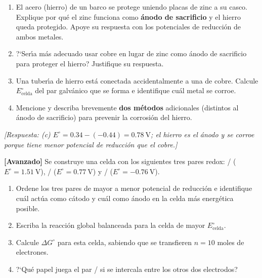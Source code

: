 \begin{bloque_ejercicios}
\begin{ejercicios}
\begin{enumerate}[label=\alph*)]
    \item El acero (hierro) de un barco se protege uniendo placas de zinc
          a su casco. Explique por qu\'e el zinc funciona como \textbf{\'anodo
          de sacrificio} y el hierro queda protegido.  Apoye su respuesta
          con los potenciales de reducci\'on de ambos metales.
    \item ?`Ser\'{\i}a m\'as adecuado usar cobre en lugar de zinc como \'anodo
          de sacrificio para proteger el hierro? Justifique su respuesta.
    \item Una tuber\'{\i}a de hierro est\'a conectada accidentalmente a una
          de cobre. Calcule $E^\circ_{\text{celda}}$ del par galv\'anico que
          se forma e identifique cu\'al metal se corroe.
    \item Mencione y describa brevemente \textbf{dos m\'etodos} adicionales
          (distintos al \'anodo de sacrificio) para prevenir la corrosi\'on
          del hierro.
\end{enumerate}

\textit{[Respuesta:
(c) $E^\circ = 0.34 - (-0.44) = \SI{0.78}{\volt}$; el hierro es el \'anodo
    y se corroe porque tiene menor potencial de reducci\'on que el cobre.]}

\item \textbf{[Avanzado]} Se construye una celda con los siguientes tres
pares redox: / ($E^\circ = \SI{1.51}{\volt}$),
/ ($E^\circ = \SI{0.77}{\volt}$) y
/ ($E^\circ = \SI{-0.76}{\volt}$).

\begin{enumerate}[label=\alph*)]
    \item Ordene los tres pares de mayor a menor potencial de reducci\'on
          e identifique cu\'al act\'ua como c\'atodo y cu\'al como \'anodo
          en la celda m\'as energ\'etica posible.
    \item Escriba la reacci\'on global balanceada para la celda de mayor
          $E^\circ_{\text{celda}}$.
    \item Calcule $\Delta G^\circ$ para esta celda, sabiendo que se
          transfieren $n = 10$ moles de electrones.
    \item ?`Qu\'e papel juega el par / si se intercala
          entre los otros dos electrodos?
\end{enumerate}

\end{ejercicios}

\end{bloque_ejercicios}
